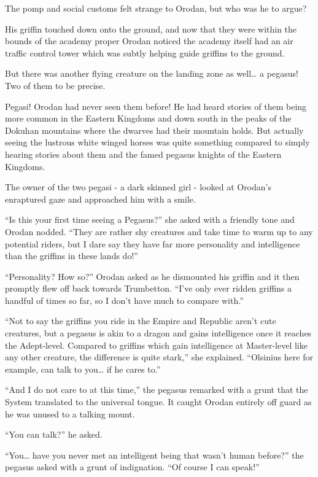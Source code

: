 \documentclass[a4paper,10pt]{book}
\begin{document}
The pomp and social customs felt strange to Orodan, but who was he to argue?\par
His griffin touched down onto the ground, and now that they were within the bounds of the academy proper Orodan noticed the academy itself had an air traffic control tower which was subtly helping guide griffins to the ground.\par
But there was another flying creature on the landing zone as well… a pegasus! Two of them to be precise.\par
Pegasi! Orodan had never seen them before! He had heard stories of them being more common in the Eastern Kingdoms and down south in the peaks of the Dokuhan mountains where the dwarves had their mountain holds. But actually seeing the lustrous white winged horses was quite something compared to simply hearing stories about them and the famed pegasus knights of the Eastern Kingdoms.\par
The owner of the two pegasi - a dark skinned girl - looked at Orodan’s enraptured gaze and approached him with a smile.\par
“Is this your first time seeing a Pegasus?” she asked with a friendly tone and Orodan nodded. “They are rather shy creatures and take time to warm up to any potential riders, but I dare say they have far more personality and intelligence than the griffins in these lands do!”\par
“Personality? How so?” Orodan asked as he dismounted his griffin and it then promptly flew off back towards Trumbetton. “I’ve only ever ridden griffins a handful of times so far, so I don’t have much to compare with.”\par
“Not to say the griffins you ride in the Empire and Republic aren’t cute creatures, but a pegasus is akin to a dragon and gains intelligence once it reaches the Adept-level. Compared to griffins which gain intelligence at Master-level like any other creature, the difference is quite stark,” she explained. “Olsinius here for example, can talk to you… if he cares to.”\par
“And I do not care to at this time,” the pegasus remarked with a grunt that the System translated to the universal tongue. It caught Orodan entirely off guard as he was unused to a talking mount.\par
“You can talk?” he asked.\par
“You… have you never met an intelligent being that wasn’t human before?” the pegasus asked with a grunt of indignation. “Of course I can speak!”\par
\end{document}
